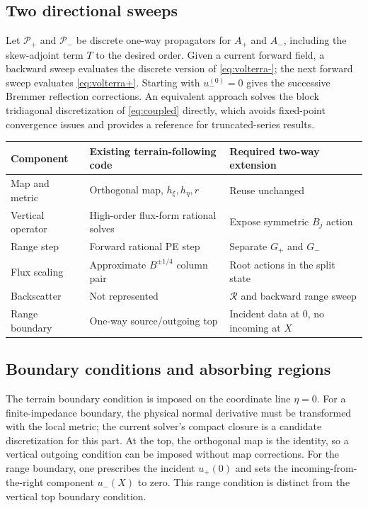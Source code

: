 \documentclass[11pt]{article}
\newcommand{\Rop}{\mathcal R}
\begin{document}
\subsection{Two directional sweeps}

Let $\mathcal{P}_+$ and $\mathcal{P}_-$ be discrete one-way propagators for
$A_+$ and $A_-$, including the skew-adjoint term $T$ to the desired order.
Given a current forward field, a backward sweep evaluates the discrete
version of \eqref{eq:volterra-}; the next forward sweep evaluates
\eqref{eq:volterra+}. Starting with $u_-^{(0)}=0$ gives the successive
Bremmer reflection corrections. An equivalent approach solves the block
tridiagonal discretization of \eqref{eq:coupled} directly, which avoids
fixed-point convergence issues and provides a reference for truncated-series
results.

\begin{center}
\begin{tabular}{@{}lll@{}}
\toprule
Component & Existing terrain-following code & Required two-way extension\\
\midrule
Map and metric & Orthogonal map, $h_\xi,h_\eta,r$ & Reuse unchanged\\
Vertical operator & High-order flux-form rational solves & Expose symmetric $B_j$ action\\
Range step & Forward rational PE step & Separate $G_+$ and $G_-$\\
Flux scaling & Approximate $B^{\pm1/4}$ column pair & Root actions in the split state\\
Backscatter & Not represented & $\Rop$ and backward range sweep\\
Range boundary & One-way source/outgoing top & Incident data at $0$, no incoming at $X$\\
\bottomrule
\end{tabular}
\end{center}

\subsection{Boundary conditions and absorbing regions}

The terrain boundary condition is imposed on the coordinate line $\eta=0$.
For a finite-impedance boundary, the physical normal derivative must be
transformed with the local metric; the current solver's compact closure is a
candidate discretization for this part. At the top, the orthogonal map is the
identity, so a vertical outgoing condition can be imposed without map
corrections. For the range boundary, one prescribes the incident $u_+(0)$ and
sets the incoming-from-the-right component $u_-(X)$ to zero. This range
condition is distinct from the vertical top boundary condition.
\end{document}
